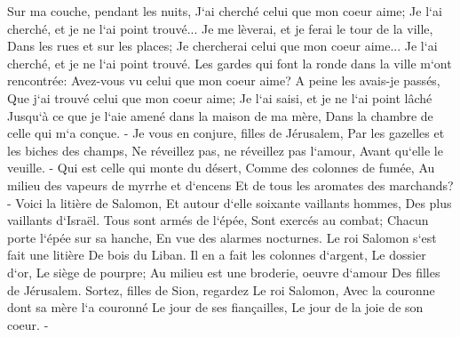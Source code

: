 \verse Sur ma couche, pendant les nuits, J`ai cherché celui que mon coeur aime; Je l`ai cherché, et je ne l`ai point trouvé... 
\verse Je me lèverai, et je ferai le tour de la ville, Dans les rues et sur les places; Je chercherai celui que mon coeur aime... Je l`ai cherché, et je ne l`ai point trouvé. 
\verse Les gardes qui font la ronde dans la ville m`ont rencontrée: Avez-vous vu celui que mon coeur aime? 
\verse A peine les avais-je passés, Que j`ai trouvé celui que mon coeur aime; Je l`ai saisi, et je ne l`ai point lâché Jusqu`à ce que je l`aie amené dans la maison de ma mère, Dans la chambre de celle qui m`a conçue. - 
\verse Je vous en conjure, filles de Jérusalem, Par les gazelles et les biches des champs, Ne réveillez pas, ne réveillez pas l`amour, Avant qu`elle le veuille. - 
\verse Qui est celle qui monte du désert, Comme des colonnes de fumée, Au milieu des vapeurs de myrrhe et d`encens Et de tous les aromates des marchands? - 
\verse Voici la litière de Salomon, Et autour d`elle soixante vaillants hommes, Des plus vaillants d`Israël. 
\verse Tous sont armés de l`épée, Sont exercés au combat; Chacun porte l`épée sur sa hanche, En vue des alarmes nocturnes. 
\verse Le roi Salomon s`est fait une litière De bois du Liban. 
\verse Il en a fait les colonnes d`argent, Le dossier d`or, Le siège de pourpre; Au milieu est une broderie, oeuvre d`amour Des filles de Jérusalem. 
\verse Sortez, filles de Sion, regardez Le roi Salomon, Avec la couronne dont sa mère l`a couronné Le jour de ses fiançailles, Le jour de la joie de son coeur. - 

\chapter{}

